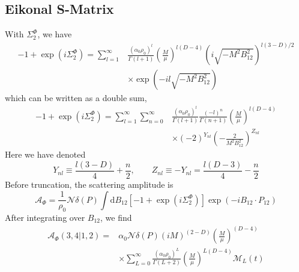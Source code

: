 \subsection{Eikonal S-Matrix}
With $\Sigma_{2}^{\Phi}$, we have
\begin{equation}
\begin{split}
	{-1} + \exp{(i \Sigma_{2}^{\Phi})} = \sum_{l = 1}^{\infty} {}& \frac{(\alpha_{0} \rho_{0})^{l}}{\Gamma(l + 1)} \left( \frac{M}{\mu} \right)^{l(D - 4)} \left( i \sqrt{-M^{2} B_{12}^{2}} \right)^{l(3 - D)/2} \\
	&\times \exp{\left(- i l \sqrt{-M^{2} B_{12}^{2}} \right)}
\end{split}
\end{equation}
which can be written as a double sum,
\begin{equation}
\begin{split}
	{-1} + \exp{(i \Sigma_{2}^{\Phi})} = \sum_{l = 1}^{\infty} \sum_{n = 0}^{\infty} {}& \frac{(\alpha_{0} \rho_{0})^{l}}{\Gamma(l + 1)} \frac{(-l)^{n}}{\Gamma(n + 1)} \left( \frac{M}{\mu} \right)^{l(D - 4)} \\
	&\times \left( -2 \right)^{Y_{nl}} \left(- \frac{2}{M^{2} B_{12}^{2}} \right)^{Z_{nl}}
\end{split} \label{EikonalFormMassive}
\end{equation}
Here we have denoted
\begin{equation}
	Y_{nl} \equiv \frac{l(3 - D)}{4} + \frac{n}{2}, \qquad Z_{nl} \equiv - Y_{nl} = \frac{l(D - 3)}{4} - \frac{n}{2}
\end{equation}
Before truncation, the scattering amplitude is
\begin{equation}
	\mathcal{A}_{\Phi} = \frac{1}{\rho_{0}} \mathcal{N} \delta(P) \int \mathrm{d}B_{12} \left[ -1 + \exp{(i \Sigma_{2}^{\Phi})} \right] \exp{(- i B_{12} \cdot P_{12})} \label{MassiveEikonalForm}
\end{equation}
After integrating over $B_{12}$, we find
\begin{equation}
\begin{split}
	\mathcal{A}_{\Phi}(3, 4|1,2) = {}& \alpha_{0} \mathcal{N} \delta(P) (iM)^{(2-D)} \left( \frac{M}{\mu} \right)^{(D - 4)} \\
	&\times \sum_{L = 0}^{\infty} \frac{(\alpha_{0} \rho_{0})^{L}}{\Gamma(L+2)} \left( \frac{M}{\mu} \right)^{L(D - 4)} \mathcal{M}_{L}(t)
\end{split}
\end{equation}
